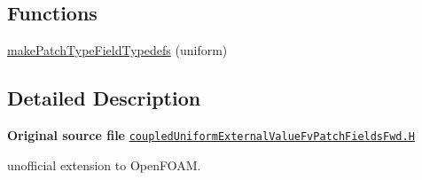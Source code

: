 \subsection*{Functions}
\begin{DoxyCompactItemize}
\item 
\hyperlink{namespaceFoam_a4c56280e0f32a8f7b92a6ba0776090da}{make\+Patch\+Type\+Field\+Typedefs} (uniform)
\end{DoxyCompactItemize}


\subsection{Detailed Description}
{\bfseries Original source file} \href{../../../home/carlo/data/GeN-Foam/GeN-Foam_ffn/GeN-Foam/GeN-Foam/FMU4FOAM/ECI4FOAM/src/externalComm/externalIO/input/BC/coupledUniformExternalValue/coupledUniformExternalValueFvPatchFieldsFwd.H}{\tt coupled\+Uniform\+External\+Value\+Fv\+Patch\+Fields\+Fwd.\+H}

\begin{DoxyVerb}unofficial extension to OpenFOAM.\end{DoxyVerb}
